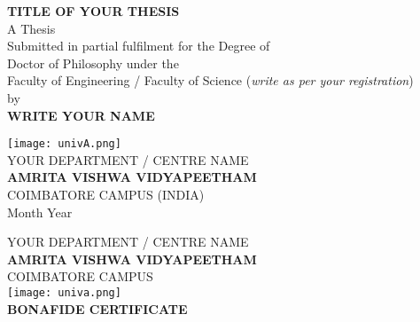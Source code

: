 \documentclass[a4paper, 12pt]{report}
\theoremstyle{definition}
\begin{document}
	\thispagestyle{empty}
	\begin{large}
		\begin{center}
			{\Large\bfseries{TITLE OF YOUR THESIS}}\\
			\vspace{1.3cm}
			A Thesis \\
			\vspace{.1cm}
			Submitted in partial fulfilment for the Degree of\\
			\vspace{.1cm}
			Doctor of Philosophy under the\\
			\vspace{.1cm}
			Faculty of Engineering / Faculty of Science (\textit{write as per your registration})\\
			\vspace{1cm}
			by\\ \vspace{0.2cm}
			\vspace{.1cm}
			{\Large\bfseries{WRITE YOUR NAME}} \\ \vspace{3cm}
			
			\texttt{[image: univA.png]}\\
			\vfill
			YOUR DEPARTMENT / CENTRE NAME\\
			\Large{\textbf{AMRITA VISHWA VIDYAPEETHAM}}\\
			{\large COIMBATORE CAMPUS (INDIA)}\\
			\vspace*{.3cm}
			Month Year
		\end{center}
	\end{large}
	\newpage
	\begin{center}
		
		{\large YOUR DEPARTMENT / CENTRE NAME}\\
		\Large{ \textbf{AMRITA VISHWA VIDYAPEETHAM}}\\
			{\large COIMBATORE CAMPUS}\\
		\vspace*{2.2cm}
		\texttt{[image: univa.png]}\\
		\vspace*{1.5cm}
		{\Large \textbf{BONAFIDE CERTIFICATE}}
	\end{center}
	\vspace*{.8cm}
\end{document}
